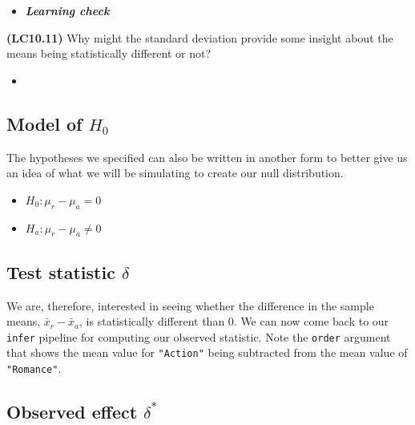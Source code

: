 \documentclass[12pt,]{krantz}
\makeatletter
\newenvironment{Shaded}{\begin{snugshade}}{\end{snugshade}}
\newcommand{\KeywordTok}[1]{\textcolor[rgb]{0.27,0.27,0.27}{\textbf{#1}}}
\newcommand{\DataTypeTok}[1]{\textcolor[rgb]{0.27,0.27,0.27}{#1}}
\newcommand{\StringTok}[1]{\textcolor[rgb]{0.5,0.5,0.5}{#1}}
\newcommand{\OperatorTok}[1]{\textcolor[rgb]{0.43,0.43,0.43}{\textbf{#1}}}
\newcommand{\NormalTok}[1]{#1}
\providecommand{\tightlist}{%
  \setlength{\itemsep}{0pt}\setlength{\parskip}{0pt}}
\newenvironment{kframe}{%
\medskip{}
\setlength{\fboxsep}{.8em}
 \def\at@end@of@kframe{}%
 \ifinner\ifhmode%
  \def\at@end@of@kframe{\end{minipage}}%
  \begin{minipage}{\columnwidth}%
 \fi\fi%
 \def\FrameCommand##1{\hskip\@totalleftmargin \hskip-\fboxsep
 \colorbox{shadecolor}{##1}\hskip-\fboxsep
     \hskip-\linewidth \hskip-\@totalleftmargin \hskip\columnwidth}%
 \MakeFramed {\advance\hsize-\width
   \@totalleftmargin\z@ \linewidth\hsize
   \@setminipage}}%
 {\par\unskip\endMakeFramed%
 \at@end@of@kframe}
\renewenvironment{Shaded}{\begin{kframe}}{\end{kframe}}
\newenvironment{rmdblock}[1]
  {\begin{shaded*}
  \begin{itemize}
  \renewcommand{\labelitemi}{
    \raisebox{-.7\height}[0pt][0pt]{
    }
  }
  \item
  }
  {
  \end{itemize}
  \end{shaded*}
  }
\newenvironment{learncheck}
  {\begin{rmdblock}{warning}}
  {\end{rmdblock}}
\theoremstyle{definition}
\theoremstyle{definition}
\theoremstyle{definition}
\theoremstyle{remark}
\makeatother
\begin{document}
\begin{learncheck}
\textbf{\emph{Learning check}}
\end{learncheck}

\textbf{(LC10.11)} Why might the standard deviation provide some insight
about the means being statistically different or not?

\begin{learncheck}

\end{learncheck}

\subsection{\texorpdfstring{Model of
\(H_0\)}{Model of H\_0}}\label{model-of-h_0}

The hypotheses we specified can also be written in another form to
better give us an idea of what we will be simulating to create our null
distribution.

\begin{itemize}
\tightlist
\item
  \(H_0: \mu_r - \mu_a = 0\)
\item
  \(H_a: \mu_r - \mu_a \ne 0\)
\end{itemize}

\subsection{\texorpdfstring{Test statistic
\(\delta\)}{Test statistic \textbackslash{}delta}}\label{test-statistic-delta}

We are, therefore, interested in seeing whether the difference in the
sample means, \(\bar{x}_r - \bar{x}_a\), is statistically different than
0. We can now come back to our \texttt{infer} pipeline for computing our
observed statistic. Note the \texttt{order} argument that shows the mean
value for \texttt{"Action"} being subtracted from the mean value of
\texttt{"Romance"}.

\subsection{\texorpdfstring{Observed effect
\(\delta^*\)}{Observed effect \textbackslash{}delta\^{}*}}\label{observed-effect-delta}

\begin{Shaded}
\end{Shaded}
\end{document}
